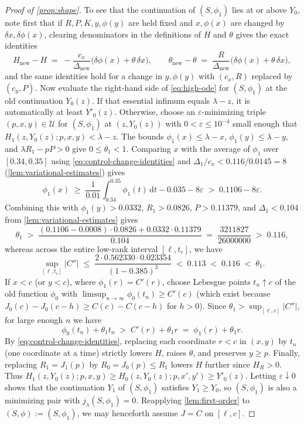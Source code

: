 \documentclass[11pt]{article}
\numberwithin{equation}{section}
\theoremstyle{plain}
\theoremstyle{definition}
\newcommand{\1}{\mathbf{1}}
\newcommand{\calU}{\mathcal{U}}
\begin{document}
\begin{proof}[Proof of {\cref{prop:shape}}]
To see that the continuation of $(S, \phi_1)$ lies at or above $Y_0$, note first that if $R, P, K, y, \phi(y)$ are held fixed and $x, \phi(x)$ are changed by $\delta x, \delta\phi(x)$, clearing denominators in the definitions of $H$ and $\theta$ gives the exact identities
\begin{equation}
  H_{\mathrm{new}} - H \;=\; -\frac{c_x}{\Delta_{\mathrm{new}}}\bigl(\delta\phi(x) + \theta\,\delta x\bigr),
  \qquad
  \theta_{\mathrm{new}} - \theta \;=\; \frac{R}{\Delta_{\mathrm{new}}}\bigl(\delta\phi(x) + \theta\,\delta x\bigr),
  \label{eq:control-change-identities}
\end{equation}
and the same identities hold for a change in $y, \phi(y)$ with $(c_x, R)$ replaced by $(c_y, P)$. Now evaluate the right-hand side of \cref{eq:high-ode} for $(S, \phi_1)$ at the old continuation $Y_0(z)$. If that essential infimum equals $\lambda - z$, it is automatically at least $Y'_0(z)$. Otherwise, choose an $\varepsilon$-minimizing triple $(p, x, y) \in \calU$ for $(S, \phi_1)$ at $(z, Y_0(z))$ with $0 < \varepsilon \le 10^{-4}$ small enough that $H_1(z, Y_0(z); p, x, y) < \lambda - z$. The bounds $\phi_1(x) \le \lambda - x$, $\phi_1(y) \le \lambda - y$, and $\lambda R_1 - p P > 0$ give $0 \le \theta_1 < 1$. Comparing $x$ with the average of $\phi_1$ over $[0.34, 0.35]$ using \cref{eq:control-change-identities} and $\Delta_1/c_x < 0.116/0.0145 = 8$ (\cref{lem:variational-estimates}) gives
\[
  \phi_1(x) \;\ge\; \frac{1}{0.01}\int_{0.34}^{0.35} \phi_1(t)\,\mathrm{d}t - 0.035 - 8\varepsilon \;>\; 0.1106 - 8\varepsilon.
\]
Combining this with $\phi_1(y) > 0.0332$, $R_1 > 0.0826$, $P > 0.11379$, and $\Delta_1 < 0.104$ from \cref{lem:variational-estimates} gives
\[
  \theta_1 \;>\; \frac{(0.1106 - 0.0008)\cdot 0.0826 + 0.0332 \cdot 0.11379}{0.104} \;=\; \frac{3211827}{26000000} \;>\; 0.116,
\]
whereas across the entire low-rank interval $[\ell, t_e]$, we have
\[
  \sup_{[\ell, t_e]} |C''| \;\le\; \frac{2 \cdot 0.562330 \cdot 0.023354}{(1 - 0.385)^3} \;<\; 0.113 \;<\; 0.116 \;<\; \theta_1.
\]
If $x < c$ (or $y < c$), where $\phi_1(r) = C'(r)$, choose Lebesgue points $t_n \uparrow c$ of the old function $\phi_0$ with $\limsup_{n \to \infty} \phi_0(t_n) \ge C'(c)$ (which exist because $J_0(c) - J_0(c - h) \ge C(c) - C(c - h)$ for $h > 0$). Since $\theta_1 > \sup_{[\ell, c]} |C''|$, for large enough $n$ we have
\[
  \phi_0(t_n) + \theta_1 t_n \;>\; C'(r) + \theta_1 r \;=\; \phi_1(r) + \theta_1 r.
\]
By \cref{eq:control-change-identities}, replacing each coordinate $r < c$ in $(x, y)$ by $t_n$ (one coordinate at a time) strictly lowers $H$, raises $\theta$, and preserves $y \ge p$. Finally, replacing $R_1 = J_1(p)$ by $R_0 = J_0(p) \le R_1$ lowers $H$ further since $H_R > 0$. Thus $H_1(z, Y_0(z); p, x, y) \ge H_0(z, Y_0(z); p, x', y') \ge Y'_0(z)$. Letting $\varepsilon \downarrow 0$ shows that the continuation $Y_1$ of $(S, \phi_1)$ satisfies $Y_1 \ge Y_0$, so $(S, \phi_1)$ is also a minimizing pair with $j_\lambda(S, \phi_1) = 0$. Reapplying \cref{lem:first-order} to $(S, \phi) := (S, \phi_1)$, we may henceforth assume $J = C$ on $[\ell, c]$.


\end{proof}
\end{document}
